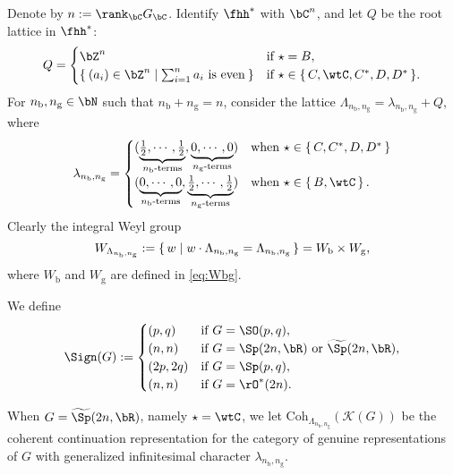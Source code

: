\documentclass[12pt,a4paper]{amsart}
\newcommand{\CK}{{\mathcal {K}}}
\numberwithin{equation}{section}
\theoremstyle{remark}
\def\half{{\tfrac{1}{2}}}
\def\Gc{G_\bC}
\def\nbb{n_{\mathrm b}}
\def\ngg{n_{\mathrm g}}
\def\Coh{\mathrm{Coh}}
\begin{document}
Denote by $n:=\rank_{\bC} \Gc$. Identify $\fhh^{*}$ with $\bC^{n}$, and let $Q$
be the root lattice in $\fhh^{*}$:
\[
  Q = \begin{cases}
    \bZ^{n} & \text{if  $\star = B$},\\
    \Set{(a_{i})\in \bZ^{n}|\sum_{i=1}^{n}a_{i} \text{ is even}}
    & \text{if  $\star \in \set{C,\wtC,C^{*},D,D^{*}}$}.\\
  \end{cases}
\]
For $n_{\mathrm b}, n_{\mathrm g}\in \bN$ such that $n_{\mathrm b}+n_{\mathrm g}=n$, consider the lattice $\Lambda_{n_{\mathrm b},n_{\mathrm g}}=\lambda_{n_{\mathrm b},n_{\mathrm g}}+Q$, where
\[
  \lambda_{n_{\mathrm b},n_{\mathrm g}} =
  \begin{cases}
    (\underbrace{\half, \cdots, \half}_{n_{\mathrm b}\text{-terms}}, \underbrace{0, \cdots, 0}_{n_{\mathrm g}\text{-terms}})  & \text{when
    } \star\in \set{C,C^{*}, D,D^{*}}\\%
    (\underbrace{0, \cdots, 0}_{n_{\mathrm b}\text{-terms}}, \underbrace{\half, \cdots, \half}_{n_{\mathrm g}\text{-terms}})  & \text{when
    } \star\in \set{B,\wtC}. %
  \end{cases}
\]
Clearly the integral Weyl group
\[
  W_{\Lambda_{\nbb,\ngg}}:= \set{w| w\cdot \Lambda_{\nbb,\ngg} = \Lambda_{\nbb,\ngg}} = W_{\mathrm b}\times W_{\mathrm g},
\]
where $W_{\mathrm b}$ and $W_{\mathrm g}$ are defined in \eqref{eq:Wbg}.


We define
\[
  \Sign(G):= \begin{cases}
    (p,q) & \text{if } G = \SO(p,q),\\
    (n,n) & \text{if } G = \Sp(2n,\bR) \text{ or } \widetilde \Sp(2n,\bR),\\
    (2p,2q) & \text{if } G = \Sp(p,q), \\
    (n,n) & \text{if } G = \rO^{*}(2n). \\
  \end{cases}
\]

When $G=\widetilde \Sp(2n,\bR)$, namely $\star = \wtC$, we let $\Coh_{\Lambda_{n_{\mathrm b},n_{\mathrm g}}}(\CK(G))$ be the coherent continuation representation for the category of genuine representations of $G$ with generalized infinitesimal character $\lambda_{n_{\mathrm b},n_{\mathrm g}}$.
\end{document}
